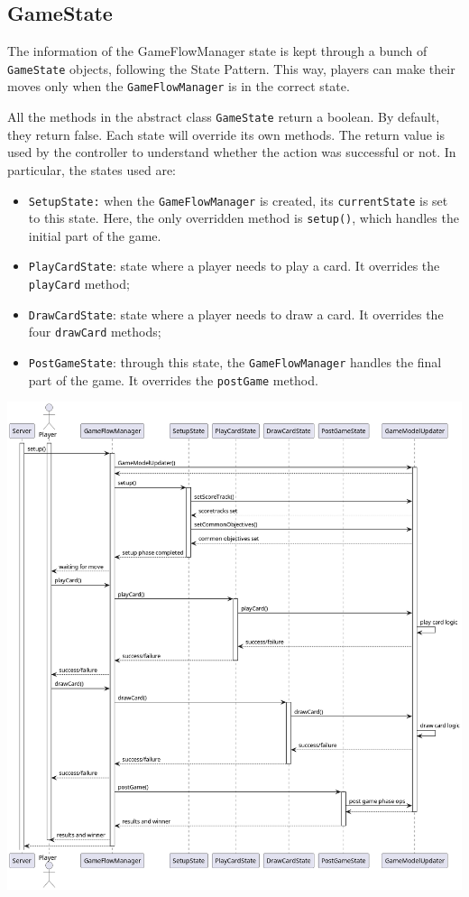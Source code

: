 \documentclass{article}
\begin{document}
\subsection{GameState}
The information of the {GameFlowManager} state is kept through a bunch of \texttt{GameState} objects, following the State Pattern.
This way, players can make their moves only when the \texttt{GameFlowManager} is in the correct state.

All the methods in the abstract class \texttt{GameState} return a boolean.
By default, they return false. Each state will override its own methods.
The return value is used by the controller to understand whether the action was successful or not.
In particular, the states used are:
\begin{itemize}
    \item \texttt{SetupState:} when the \texttt{GameFlowManager} is created, its \texttt{currentState} is set to this state.
          Here, the only overridden method is \texttt{setup()}, which handles the initial part of the game.
    \item \texttt{PlayCardState}: state where a player needs to play a card. It overrides the \texttt{playCard} method;
    \item \texttt{DrawCardState}: state where a player needs to draw a card. It overrides the four \texttt{drawCard} methods;
    \item \texttt{PostGameState}: through this state, the \texttt{GameFlowManager} handles the final part of the game.
                                  It overrides the \texttt{postGame} method.
\end{itemize}
\begin{center}
    \includegraphics[scale=0.27]{pngs/sequence_controller}
\end{center}
\end{document}
